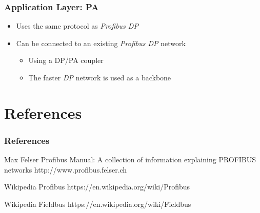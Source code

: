 \documentclass{beamer}
\begin{document}
\begin{frame}
  \frametitle{Application Layer: PA}
  \begin{itemize}
    \item Uses the same protocol as \textit{Profibus DP}
    \item Can be connected to an existing \textit{Profibus DP} network
      \begin{itemize}
        \item Using a DP/PA coupler
        \item The faster \textit{DP} network is used as a backbone
      \end{itemize}
  \end{itemize}
\end{frame}

\section*{References}
\begin{frame}[allowframebreaks]
  \frametitle{References}
  \begin{thebibliography}{10}
  \beamertemplatebookbibitems
    Max Felser
    \newblock Profibus Manual: A collection of information explaining PROFIBUS networks
    \newblock http://www.profibus.felser.ch

    Wikipedia
    \newblock Profibus
    \newblock https://en.wikipedia.org/wiki/Profibus

    Wikipedia
    \newblock Fieldbus
    \newblock https://en.wikipedia.org/wiki/Fieldbus
   \end{thebibliography}
 \end{frame}
\end{document}
